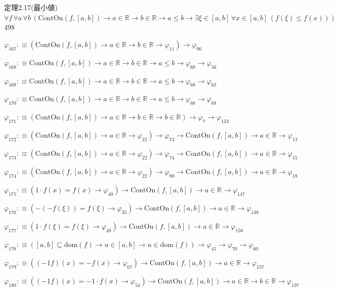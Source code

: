 \begin{fullproof}{定理2.17(最小値)}{$\forall f\,\forall a\,\forall b\,(\mathrm{ContOn}(f,[a,b]) \to a \in \mathbb{R} \to b \in \mathbb{R} \to a \leq b \to \exists \xi \in [a,b]\,\forall x \in [a,b]\,(f(\xi) \leq f(x)))$}{498}
\begin{abbrevlist}
\item $\varphi_{167} :\equiv (\mathrm{ContOn}(f,[a,b]) \to a \in \mathbb{R} \to b \in \mathbb{R} \to \varphi_{11}) \to \varphi_{96}$
\item $\varphi_{168} :\equiv \mathrm{ContOn}(f,[a,b]) \to a \in \mathbb{R} \to b \in \mathbb{R} \to a \leq b \to \varphi_{68} \to \varphi_{56}$
\item $\varphi_{169} :\equiv \mathrm{ContOn}(f,[a,b]) \to a \in \mathbb{R} \to b \in \mathbb{R} \to a \leq b \to \varphi_{68} \to \varphi_{63}$
\item $\varphi_{170} :\equiv \mathrm{ContOn}(f,[a,b]) \to a \in \mathbb{R} \to b \in \mathbb{R} \to a \leq b \to \varphi_{68} \to \varphi_{68}$
\item $\varphi_{171} :\equiv (\mathrm{ContOn}(f,[a,b]) \to a \in \mathbb{R} \to b \in \mathbb{R} \to b \in \mathbb{R}) \to \varphi_{7} \to \varphi_{123}$
\item $\varphi_{172} :\equiv (\mathrm{ContOn}(f,[a,b]) \to a \in \mathbb{R} \to \varphi_{22}) \to \varphi_{73} \to \mathrm{ContOn}(f,[a,b]) \to a \in \mathbb{R} \to \varphi_{13}$
\item $\varphi_{173} :\equiv (\mathrm{ContOn}(f,[a,b]) \to a \in \mathbb{R} \to \varphi_{22}) \to \varphi_{74} \to \mathrm{ContOn}(f,[a,b]) \to a \in \mathbb{R} \to \varphi_{15}$
\item $\varphi_{174} :\equiv (\mathrm{ContOn}(f,[a,b]) \to a \in \mathbb{R} \to \varphi_{22}) \to \varphi_{80} \to \mathrm{ContOn}(f,[a,b]) \to a \in \mathbb{R} \to \varphi_{18}$
\item $\varphi_{175} :\equiv (1 \cdot f(x) = f(x) \to \varphi_{40}) \to \mathrm{ContOn}(f,[a,b]) \to a \in \mathbb{R} \to \varphi_{147}$
\item $\varphi_{176} :\equiv (-(-f(\xi)) = f(\xi) \to \varphi_{35}) \to \mathrm{ContOn}(f,[a,b]) \to a \in \mathbb{R} \to \varphi_{138}$
\item $\varphi_{177} :\equiv (1 \cdot f(\xi) = f(\xi) \to \varphi_{48}) \to \mathrm{ContOn}(f,[a,b]) \to a \in \mathbb{R} \to \varphi_{150}$
\item $\varphi_{178} :\equiv ([a,b] \subseteq \mathrm{dom}(f) \to u \in [a,b] \to u \in \mathrm{dom}(f)) \to \varphi_{45} \to \varphi_{70} \to \varphi_{60}$
\item $\varphi_{179} :\equiv ((-1 f)(x) = -f(x) \to \varphi_{67}) \to \mathrm{ContOn}(f,[a,b]) \to a \in \mathbb{R} \to \varphi_{157}$
\item $\varphi_{180} :\equiv ((-1 f)(x) = -1 \cdot f(x) \to \varphi_{54}) \to \mathrm{ContOn}(f,[a,b]) \to a \in \mathbb{R} \to b \in \mathbb{R} \to \varphi_{137}$

\end{abbrevlist}
\end{fullproof}
